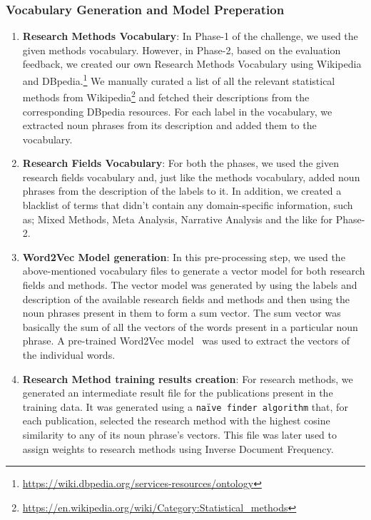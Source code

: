 \documentclass[runningheads]{llncs}
\begin{document}
\subsubsection{Vocabulary Generation and Model Preperation}
\smallskip
\begin{enumerate}
    \item \textbf{Research Methods Vocabulary}: In Phase-1 of the challenge, we used the given methods vocabulary. However, in Phase-2, based on the evaluation feedback, we created our own Research Methods Vocabulary using Wikipedia and DBpedia.\footnote{\url{https://wiki.dbpedia.org/services-resources/ontology}} We manually curated a list of all the relevant statistical methods from Wikipedia\footnote{\url{https://en.wikipedia.org/wiki/Category:Statistical\_methods}} and fetched their descriptions from the corresponding DBpedia resources. 
    For each label in the vocabulary, we extracted noun phrases from its description and added them to the vocabulary.  
    \smallskip
    \item \textbf{Research Fields Vocabulary}: For both the phases, we used the given research fields vocabulary and, just like the methods vocabulary, added noun phrases from the description of the labels to it. In addition, we created a blacklist of terms that didn't contain any domain-specific information, such as; Mixed Methods, Meta Analysis, Narrative Analysis and the like for Phase-2.  
    \smallskip
    \item \textbf{Word2Vec Model generation}: In this pre-processing step, we used the above-mentioned vocabulary files to generate a vector model for both research fields and methods. %
    The vector model was generated by using the labels and description of the available research fields and methods and then using the noun phrases present in them to form a sum vector. The sum vector was basically the sum of all the vectors of the words present in a particular noun phrase. %
    A pre-trained Word2Vec model~\cite{DBLP:journals/corr/abs-1301-3781} was used to extract the vectors of the individual words.
    \smallskip
    \item \textbf{Research Method training results creation}: For research methods, we generated an intermediate %
    result file for the publications present in the training data. %
    It was generated using a \texttt{naïve finder algorithm} that, for each publication, selected the research method  with the highest cosine similarity to any of its noun phrase’s vectors. This file was later used to assign weights to research methods using Inverse Document Frequency.
\end{enumerate}
\end{document}

